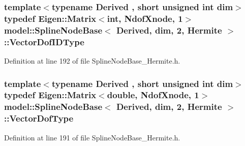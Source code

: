 \subsubsection[{Vector\+Dof\+I\+D\+Type}]{\setlength{\rightskip}{0pt plus 5cm}template$<$typename Derived , short unsigned int dim$>$ typedef Eigen\+::\+Matrix$<$int, {\bf Ndof\+Xnode}, 1$>$ {\bf model\+::\+Spline\+Node\+Base}$<$ Derived, {\bf dim}, 2, {\bf Hermite} $>$\+::{\bf Vector\+Dof\+I\+D\+Type}}\label{classmodel_1_1_spline_node_base_3_01_derived_00_01dim_00_012_00_01_hermite_01_4_ae8bedfd4860470c1c8c1ace633f29c2b}


Definition at line 192 of file Spline\+Node\+Base\+\_\+\+Hermite.\+h.

\hypertarget{classmodel_1_1_spline_node_base_3_01_derived_00_01dim_00_012_00_01_hermite_01_4_ae84e26005498ece8bb33e3fed1a61d55}{}
\subsubsection[{Vector\+Dof\+Type}]{\setlength{\rightskip}{0pt plus 5cm}template$<$typename Derived , short unsigned int dim$>$ typedef Eigen\+::\+Matrix$<$double, {\bf Ndof\+Xnode}, 1$>$ {\bf model\+::\+Spline\+Node\+Base}$<$ Derived, {\bf dim}, 2, {\bf Hermite} $>$\+::{\bf Vector\+Dof\+Type}}\label{classmodel_1_1_spline_node_base_3_01_derived_00_01dim_00_012_00_01_hermite_01_4_ae84e26005498ece8bb33e3fed1a61d55}


Definition at line 191 of file Spline\+Node\+Base\+\_\+\+Hermite.\+h.



